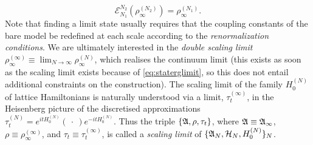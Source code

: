\documentclass[12pt]{article}
\newcommand{\cH}{\mathcal H}\newcommand{\fH}{\mathfrak H}\newcommand{\scrH}{\mathscr H}
\newcommand{\1}{\mathds{1}}
\begin{document}
\begin{equation}
\label{eq:staterglimit}
\mathcal{E}_{N_1}^{N_2}(\rho^{(N_{2})}_{\infty}) = \rho^{(N_{1})}_{\infty}.
\end{equation}
Note that finding a limit state usually requires that the coupling constants of the bare model be redefined at each scale according to the \emph{renormalization conditions}.
We are ultimately interested in the \emph{double scaling limit} $\rho_{\infty}^{(\infty)}\equiv\lim_{N\rightarrow \infty} \rho_\infty^{(N)}$, which realises the continuum limit (this exists as soon as the scaling limit exists because of \eqref{eq:staterglimit}, so this does not entail additional constraints on the construction). The scaling limit of the family $H^{(N)}_{0}$ of lattice Hamiltonians is naturally understood via a limit, $\tau^{(\infty)}_{t}$, in the Heisenberg picture of the discretised approximations $\tau^{(N)}_{t}\!=\!e^{i t H^{(N)}_{0}}\!(\!\ \cdot\!\ )e^{-i t H^{(N)}_{0}}$. Thus the triple $\{\mathfrak A,\rho,\tau_{t}\}$, where $\mathfrak A \equiv \mathfrak A_{\infty}$, $\rho \equiv \rho^{(\infty)}_{\infty}$, and $\tau_t \equiv \tau_t^{(\infty)}$, is called a \emph{scaling limit} of $\{\fA_{N},\cH_{N},H^{(N)}_{0}\}_{N}$.
\end{document}
